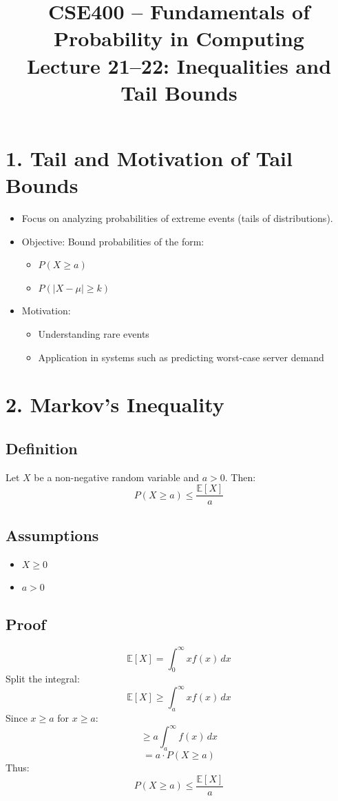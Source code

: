 \documentclass[12pt]{article}
\title{CSE400 -- Fundamentals of Probability in Computing\\
Lecture 21--22: Inequalities and Tail Bounds}
\date{}
\begin{document}
\maketitle

\section*{1. Tail and Motivation of Tail Bounds}

\begin{itemize}
    \item Focus on analyzing probabilities of extreme events (tails of distributions).
    \item Objective: Bound probabilities of the form:
    \begin{itemize}
        \item $P(X \geq a)$
        \item $P(|X - \mu| \geq k)$
    \end{itemize}
    \item Motivation:
    \begin{itemize}
        \item Understanding rare events
        \item Application in systems such as predicting worst-case server demand
    \end{itemize}
\end{itemize}

\section*{2. Markov's Inequality}

\subsection*{Definition}
Let $X$ be a non-negative random variable and $a > 0$. Then:
\[
P(X \geq a) \leq \frac{\mathbb{E}[X]}{a}
\]

\subsection*{Assumptions}
\begin{itemize}
    \item $X \geq 0$
    \item $a > 0$
\end{itemize}

\subsection*{Proof}
\[
\mathbb{E}[X] = \int_0^\infty x f(x)\, dx
\]
Split the integral:
\[
\mathbb{E}[X] \geq \int_a^\infty x f(x)\, dx
\]
Since $x \geq a$ for $x \geq a$:
\[
\geq a \int_a^\infty f(x)\, dx
\]
\[
= a \cdot P(X \geq a)
\]
Thus:
\[
P(X \geq a) \leq \frac{\mathbb{E}[X]}{a}
\]
\end{document}
